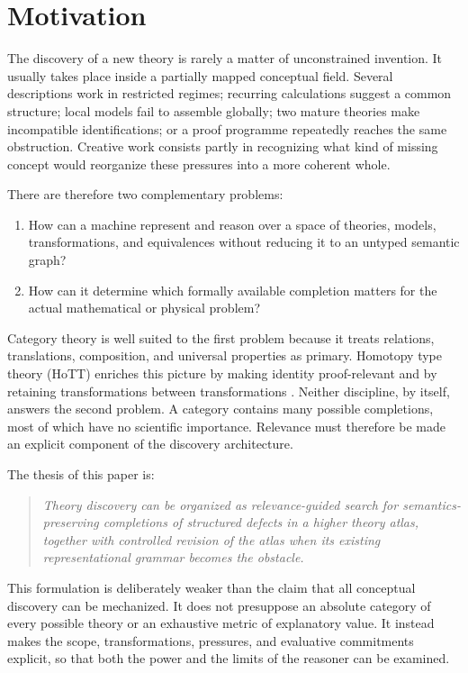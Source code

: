 \documentclass[11pt]{article}
\begin{document}
\tableofcontents
\newpage

\section{Motivation}

The discovery of a new theory is rarely a matter of unconstrained invention. It usually takes place
inside a partially mapped conceptual field. Several descriptions work in restricted regimes; recurring
calculations suggest a common structure; local models fail to assemble globally; two mature theories
make incompatible identifications; or a proof programme repeatedly reaches the same obstruction.
Creative work consists partly in recognizing what kind of missing concept would reorganize these
pressures into a more coherent whole.

There are therefore two complementary problems:
\begin{enumerate}
  \item How can a machine represent and reason over a space of theories, models, transformations,
  and equivalences without reducing it to an untyped semantic graph?
  \item How can it determine which formally available completion matters for the actual mathematical
  or physical problem?
\end{enumerate}

Category theory is well suited to the first problem because it treats relations, translations,
composition, and universal properties as primary. Homotopy type theory (HoTT) enriches this picture
by making identity proof-relevant and by retaining transformations between transformations
\cite{hottbook}. Neither discipline, by itself, answers the second problem. A category contains many
possible completions, most of which have no scientific importance. Relevance must therefore be made
an explicit component of the discovery architecture.

The thesis of this paper is:

\begin{quote}
\emph{Theory discovery can be organized as relevance-guided search for semantics-preserving
completions of structured defects in a higher theory atlas, together with controlled revision of the
atlas when its existing representational grammar becomes the obstacle.}
\end{quote}

This formulation is deliberately weaker than the claim that all conceptual discovery can be
mechanized. It does not presuppose an absolute category of every possible theory or an exhaustive
metric of explanatory value. It instead makes the scope, transformations, pressures, and evaluative
commitments explicit, so that both the power and the limits of the reasoner can be examined.
\end{document}
